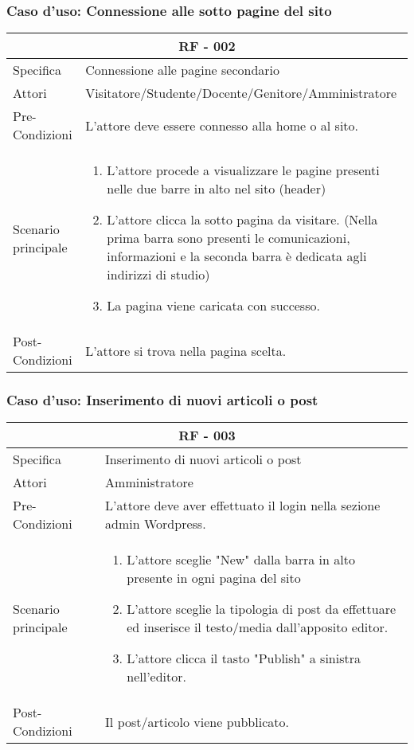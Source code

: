 \documentclass{article}
\begin{document}
\subsubsection{\textbf{Caso d'uso: Connessione alle sotto pagine del sito}}
\begin{tabular}{ |p{3cm}|p{9cm}|  }
	\hline
	\multicolumn{2}{|c|}{\textbf{RF - 002}} \\
	\hline
	Specifica& Connessione alle pagine secondario\\
	\hline
	Attori& Visitatore/Studente/Docente/Genitore/Amministratore\\
	\hline
	Pre-Condizioni& L'attore deve essere connesso alla home o al sito.\\
	\hline
	Scenario principale& \begin{enumerate}
		\item L'attore procede a visualizzare le pagine presenti nelle due barre in alto nel sito (header)
		\item L'attore clicca la sotto pagina da visitare. (Nella prima barra sono presenti le comunicazioni, informazioni e la seconda barra è dedicata agli indirizzi di studio)
		\item La pagina viene caricata con successo.
	\end{enumerate}\\
	\hline
	Post-Condizioni& L'attore si trova nella pagina scelta.\\
	\hline
\end{tabular}
\subsubsection{\textbf{Caso d'uso: Inserimento di nuovi articoli o post}}
\begin{tabular}{ |p{3cm}|p{9cm}|  }
	\hline
	\multicolumn{2}{|c|}{\textbf{RF - 003}} \\
	\hline
	Specifica& Inserimento di nuovi articoli o post\\
	\hline
	Attori& Amministratore\\
	\hline
	Pre-Condizioni& L'attore deve aver effettuato il login nella sezione admin Wordpress.\\
	\hline
	Scenario principale& \begin{enumerate}
		\item L'attore sceglie "New" dalla barra in alto presente in ogni pagina del sito
		\item L'attore sceglie la tipologia di post da effettuare ed inserisce il testo/media dall'apposito editor.
		\item L'attore clicca il tasto "Publish" a sinistra nell'editor.
	\end{enumerate}\\
	\hline
	Post-Condizioni& Il post/articolo viene pubblicato.\\
	\hline
\end{tabular}
\end{document}
